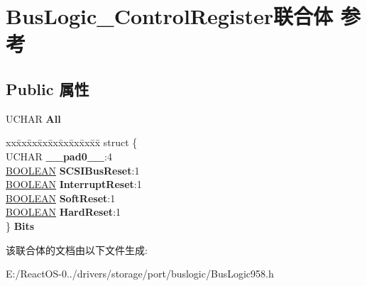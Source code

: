 \hypertarget{union_bus_logic___control_register}{}\section{Bus\+Logic\+\_\+\+Control\+Register联合体 参考}
\label{union_bus_logic___control_register}
\subsection*{Public 属性}
\begin{DoxyCompactItemize}
\item 
\mbox{\label{union_bus_logic___control_register_a7424a62928e1bf7e2d7c9818d71a06e6}} 
U\+C\+H\+AR {\bfseries All}
\item 
\mbox{\label{union_bus_logic___control_register_ad1d38816bb2375a1328ecfbf96c8e27e}} 
\begin{tabbing}
xx\=xx\=xx\=xx\=xx\=xx\=xx\=xx\=xx\=\kill
struct \{\\
\>UCHAR {\bfseries \_\_pad0\_\_}:4\\
\>\hyperlink{_processor_bind_8h_a112e3146cb38b6ee95e64d85842e380a}{BOOLEAN} {\bfseries SCSIBusReset}:1\\
\>\hyperlink{_processor_bind_8h_a112e3146cb38b6ee95e64d85842e380a}{BOOLEAN} {\bfseries InterruptReset}:1\\
\>\hyperlink{_processor_bind_8h_a112e3146cb38b6ee95e64d85842e380a}{BOOLEAN} {\bfseries SoftReset}:1\\
\>\hyperlink{_processor_bind_8h_a112e3146cb38b6ee95e64d85842e380a}{BOOLEAN} {\bfseries HardReset}:1\\
\} {\bfseries Bits}\\

\end{tabbing}\end{DoxyCompactItemize}


该联合体的文档由以下文件生成\+:\begin{DoxyCompactItemize}
\item 
E\+:/\+React\+O\+S-\/0../drivers/storage/port/buslogic/Bus\+Logic958.\+h\end{DoxyCompactItemize}

